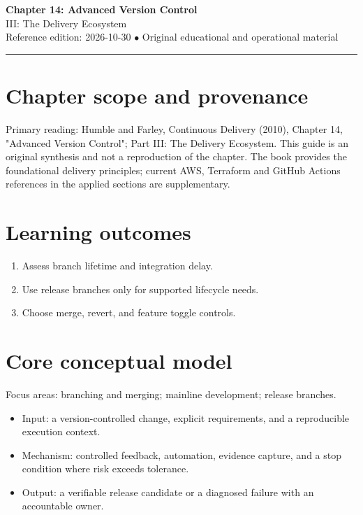 \documentclass[10pt,letterpaper]{article}
\begin{document}
\begin{center}
{\LARGE\bfseries\color{cdblue}Chapter 14: Advanced Version Control}\\[7pt]
{\large III: The Delivery Ecosystem}\\[6pt]
{\small Reference edition: 2026-10-30 $\bullet$ Original educational and operational material}
\end{center}
\noindent\color{cdblue}\rule{\linewidth}{1.2pt}\color{black}
\vspace{0.4em}
\section{Chapter scope and provenance}
Primary reading: Humble and Farley, Continuous Delivery (2010), Chapter 14, "Advanced Version Control"; Part III: The Delivery Ecosystem. This guide is an original synthesis and not a reproduction of the chapter. The book provides the foundational delivery principles; current AWS, Terraform and GitHub Actions references in the applied sections are supplementary.


\section{Learning outcomes}
\begin{enumerate}
\item Assess branch lifetime and integration delay.
\item Use release branches only for supported lifecycle needs.
\item Choose merge, revert, and feature toggle controls.
\end{enumerate}

\section{Core conceptual model}
Focus areas: branching and merging; mainline development; release branches.

\begin{itemize}
\item Input: a version-controlled change, explicit requirements, and a reproducible execution context.
\item Mechanism: controlled feedback, automation, evidence capture, and a stop condition where risk exceeds tolerance.
\item Output: a verifiable release candidate or a diagnosed failure with an accountable owner.
\end{itemize}
\end{document}
